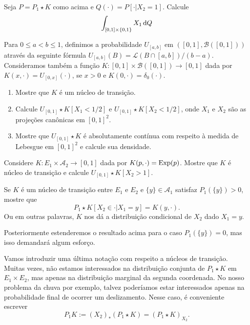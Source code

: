 \begin{exercise}
  Seja $P = P_1 \star K$ como acima e $Q(\cdot) = P[\cdot | X_2 = 1]$.
  Calcule
  \begin{equation}
    \int_{[0,1] \times \{0,1\}} X_1 \mathop{}\!\mathrm{d} Q
  \end{equation}
\end{exercise}

\begin{exercise}
  Para $0 \leq a < b \leq 1$, definimos a probabilidade $U_{[a,b]}$ em $([0,1], \mathcal{B}([0,1]))$ através da seguinte fórmula $U_{[a,b]}(B) = \mathcal{L}(B \cap [a,b])/(b-a)$.
  Consideramos também a função $K:[0,1] \times \mathcal{B}([0,1]) \to [0,1]$ dada por $K(x, \cdot) = U_{[0,x]} (\cdot)$, se $x > 0$ e $K(0, \cdot) = \delta_0(\cdot)$.
  \begin{enumerate}[\quad a)]
  \item Mostre que $K$ é um núcleo de transição.
  \item Calcule $U_{[0,1]} \star K [X_1 < 1/2]$ e $U_{[0,1]} \star K [X_2 < 1/2]$, onde $X_1$ e $X_2$ são as projeções canônicas em $[0,1]^2$.
  \item Mostre que $U_{[0,1]} \star K$ é absolutamente contínua com respeito à medida de Lebesgue em $[0,1]^2$ e calcule sua densidade.
\end{enumerate}

\end{exercise}

\begin{exercise}
  Considere $K:E_1 \times \mathcal{A}_2 \to [0,1]$ dada por $K(p, \cdot) = \operatorname{Exp}(p)$.
  Mostre que $K$ é núcleo de transição e calcule $U_{[0,1]} \star K [X_2 > 1]$.
\end{exercise}

\begin{exercise}
  Se $K$ é um núcleo de transição entre $E_1$ e $E_2$ e $\{y\} \in \mathcal{A}_1$ satisfaz $P_1(\{y\}) > 0$, mostre que
  \begin{equation}
    P_1 \star K [X_2 \in \cdot | X_1 = y] = K(y, \cdot).
  \end{equation}
  Ou em outras palavras, $K$ nos dá a distribuição condicional de $X_2$ dado $X_1 = y$.
\end{exercise}

Posteriormente estenderemos o resultado acima para o caso $P_1(\{y\}) = 0$, mas isso demandará algum esforço.

Vamos introduzir uma última notação com respeito a núcleos de transição.
Muitas vezes, não estamos interessados na distribuição conjunta de $P_1 \star K$ em $E_1 \times E_2$, mas apenas na distribuição marginal da segunda coordenada.
No nosso problema da chuva por exemplo, talvez poderíamos estar interessados apenas na probabilidade final de ocorrer um deslizamento.
Nesse caso, é conveniente escrever
\begin{equation}
  \label{e:P1_K}
  P_1 K := (X_2)_*(P_1 \star K) = (P_1 \star K)_{X_2}.
\end{equation}


